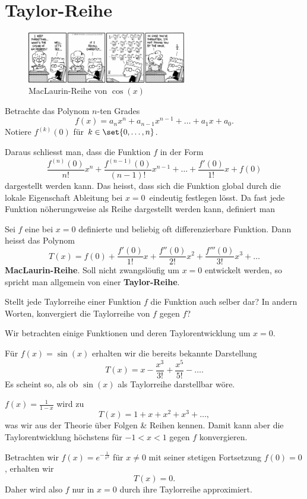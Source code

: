 \documentclass[%
draft,
11pt,%
twoside,%
titlepage,%
german,%
headsepline%
]{scrartcl}
\begin{document}
\section{Taylor-Reihe}
\begin{figure}
  \begin{center}
    \includegraphics[width=0.618\textwidth]{pictures/taylor}
  \end{center}
\caption{MacLaurin-Reihe von $\cos(x)$}
\end{figure}
\begin{ueb}
Betrachte das Polynom $n$-ten Grades
$$f(x)=a_nx^n+a_{n-1}x^{n-1}+\dots+a_1x+a_0.$$
Notiere $f^{(k)}(0)$ f\"ur $k\in\set{0,\dots,n}$.
\end{ueb}
\noindent Daraus schliesst man, dass die Funktion $f$ in der Form
$$\frac{f^{(n)}(0)}{n!}x^n+\frac{f^{(n-1)}(0)}{(n-1)!}x^{n-1}+\dots+\frac{f'(0)}{1!}x+f(0)$$
dargestellt werden kann. Das heisst, dass sich die Funktion global durch die lokale Eigenschaft \glqq Ableitung bei $x=0$\grqq\ eindeutig festlegen l\"osst.
Da fast jede Funktion n\"oherungsweise als Reihe dargestellt werden kann, definiert man

\begin{defn}
Sei $f$ eine bei $x=0$ definierte und beliebig oft differenzierbare Funktion. Dann heisst das Polynom
$$T(x)=f(0)+\frac{f'(0)}{1!}x+\frac{f''(0)}{2!}x^2+\frac{f'''(0)}{3!}x^3+\dots$$
\textbf{MacLaurin-Reihe}.
Soll
nicht zwangsl\"oufig um $x=0$ entwickelt werden, so spricht man allgemein von einer \textbf{Taylor-Reihe}.
\end{defn}

\begin{ueb}
Stellt jede Taylorreihe einer Funktion $f$ die Funktion auch selber dar? In andern Worten, konvergiert die Taylorreihe von $f$ gegen $f$?
\end{ueb}

\begin{bsp}
Wir betrachten einige Funktionen und deren Taylorentwicklung um $x=0$.
\begin{enumeratea}
\item F\"ur $f(x)=\sin(x)$ erhalten wir die bereits bekannte Darstellung
$$T(x)=x-\frac{x^3}{3!}+\frac{x^5}{5!}-\dots.$$
Es scheint so, als ob $\sin(x)$ als Taylorreihe darstellbar w\"ore.
\item $f(x)=\frac{1}{1-x}$ wird zu
$$T(x)=1+x+x^2+x^3+\dots,$$
was wir aus der Theorie \"uber Folgen \& Reihen kennen. Damit kann aber die Taylorentwicklung h\"ochstens f\"ur $-1<x<1$ gegen $f$ konvergieren.
\item Betrachten wir $f(x)=e^{-\frac{1}{x^2}}$ f\"ur $x\neq0$ mit seiner stetigen Fortsetzung $f(0)=0$, erhalten wir
$$T(x)=0.$$
Daher wird also $f$ nur in $x=0$ durch ihre Taylorreihe approximiert.
\end{enumeratea}
\end{bsp}
\end{document}
